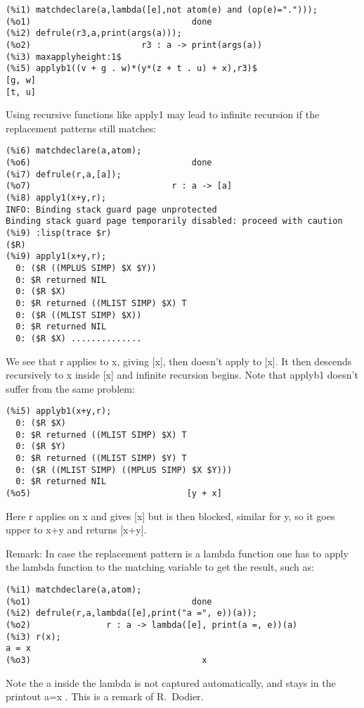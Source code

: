 \documentclass[a4paper,11pt]{article}
\begin{document}
\begin{verbatim}
(%i1) matchdeclare(a,lambda([e],not atom(e) and (op(e)=".")));
(%o1)                                done
(%i2) defrule(r3,a,print(args(a)));
(%o2)                      r3 : a -> print(args(a))
(%i3) maxapplyheight:1$
(%i5) applyb1((v + g . w)*(y*(z + t . u) + x),r3)$
[g, w] 
[t, u] 
\end{verbatim}
Using recursive functions like apply1 may lead to infinite recursion
if the replacement patterns still matches:
\begin{verbatim}
(%i6) matchdeclare(a,atom);
(%o6)                                done
(%i7) defrule(r,a,[a]);
(%o7)                            r : a -> [a]
(%i8) apply1(x+y,r);
INFO: Binding stack guard page unprotected
Binding stack guard page temporarily disabled: proceed with caution
(%i9) :lisp(trace $r)
($R)
(%i9) apply1(x+y,r);
  0: ($R ((MPLUS SIMP) $X $Y))
  0: $R returned NIL
  0: ($R $X)
  0: $R returned ((MLIST SIMP) $X) T
  0: ($R ((MLIST SIMP) $X))
  0: $R returned NIL
  0: ($R $X) ..............
\end{verbatim}
We see that r applies to x, giving [x], then doesn't apply to [x]. It then
descends recursively to x inside [x] and infinite recursion begins. Note
that applyb1 doesn't suffer from the same problem:

\begin{verbatim}
(%i5) applyb1(x+y,r);
  0: ($R $X)
  0: $R returned ((MLIST SIMP) $X) T
  0: ($R $Y)
  0: $R returned ((MLIST SIMP) $Y) T
  0: ($R ((MLIST SIMP) ((MPLUS SIMP) $X $Y)))
  0: $R returned NIL
(%o5)                               [y + x]
\end{verbatim}

Here r applies on x and gives [x] but is then blocked, similar for y, so it goes
upper to x+y and returns [x+y].


Remark: In case the replacement pattern is a lambda function one has to apply the
lambda function to the matching variable to get the result, such as:
\begin{verbatim}
(%i1) matchdeclare(a,atom);
(%o1)                                done
(%i2) defrule(r,a,lambda([e],print("a =", e))(a));
(%o2)               r : a -> lambda([e], print(a =, e))(a)
(%i3) r(x);
a = x 
(%o3)                                  x
\end{verbatim}
Note the a inside the lambda is not captured automatically, and stays in the
printout a=x . This is a remark of R.\ Dodier.
\end{document}
